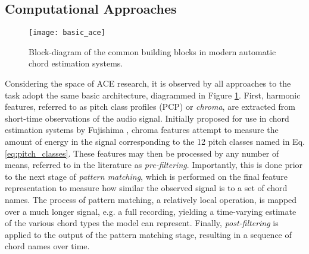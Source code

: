 \subsection{Computational Approaches}
\label{subsec:computational_approaches}

\begin{figure}[t]
\centering
\texttt{[image: basic\_ace]}
\caption{Block-diagram of the common building blocks in modern automatic chord estimation systems.}
\label{fig:basic_ace}
\end{figure}

Considering the space of ACE research, it is observed by \cite{Cho2014Improved} all approaches to the task adopt the same basic architecture, diagrammed in Figure \ref{fig:basic_ace}.
First, harmonic features, referred to as pitch class profiles (PCP) or \emph{chroma}, are extracted from short-time observations of the audio signal.
Initially proposed for use in chord estimation systems by Fujishima \cite{Fujishima1999Realtime}, chroma features attempt to measure the amount of energy in the signal corresponding to the 12 pitch classes named in Eq. \ref{eq:pitch_classes}.
These features may then be processed by any number of means, referred to in the literature as \emph{pre-filtering}.
Importantly, this is done prior to the next stage of \emph{pattern matching}, which is performed on the final feature representation to measure how similar the observed signal is to a set of chord names.
The process of pattern matching, a relatively local operation, is mapped over a much longer signal, e.g. a full recording, yielding a time-varying estimate of the various chord types the model can represent.
Finally, \emph{post-filtering} is applied to the output of the pattern matching stage, resulting in a sequence of chord names over time.

